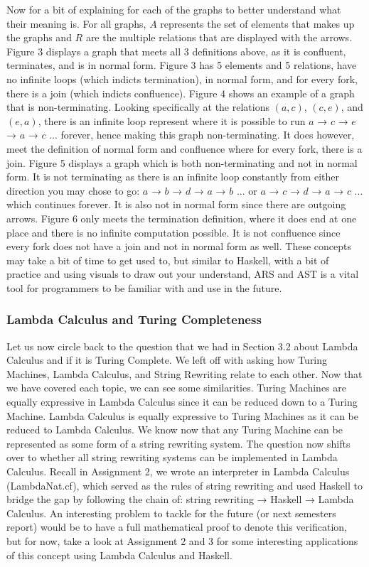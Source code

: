\documentclass{article}
\begin{document}
Now for a bit of explaining for each of the graphs to better understand what their meaning is. For all graphs, $A$ represents the set of elements that makes up the graphs and $R$ are the multiple relations that are displayed with the arrows. Figure 3 displays a graph that meets all 3 definitions above, as it is confluent, terminates, and is in normal form. Figure 3 has 5 elements and 5 relations, have no infinite loops (which indicts termination), in normal form, and for every fork, there is a join (which indicts confluence). Figure 4 shows an example of a graph that is non-terminating. Looking specifically at the relations $(a,c)$, $(c,e)$, and $(e,a)$, there is an infinite loop represent where it is possible to run $a$ → $c$ → $e$ → $a$ → $c$ ... forever, hence making this graph non-terminating. It does however, meet the definition of normal form and confluence where for every fork, there is a join. Figure 5 displays a graph which is both non-terminating and not in normal form. It is not terminating as there is an infinite loop constantly from either direction you may chose to go:  $a$ → $b$ → $d$ → $a$ → $b$ ... or  $a$ → $c$ → $d$ → $a$ → $c$ ... which continues forever. It is also not in normal form since there are outgoing arrows. Figure 6 only meets the termination definition, where it does end at one place and there is no infinite computation possible. It is not confluence since every fork does not have a join and not in normal form as well. These concepts may take a bit of time to get used to, but similar to Haskell, with a bit of practice and using visuals to draw out your understand, ARS and AST is a vital tool for programmers to be familiar with and use in the future.

\subsubsection{Lambda Calculus and Turing Completeness}
Let us now circle back to the question that we had in Section 3.2 about Lambda Calculus and if it is Turing Complete. We left off with asking how Turing Machines, Lambda Calculus, and String Rewriting relate to each other. Now that we have covered each topic, we can see some similarities. Turing Machines are equally expressive in Lambda Calculus since it can be reduced down to a Turing Machine. Lambda Calculus is equally expressive to Turing Machines as it can be reduced to Lambda Calculus. We know now that any Turing Machine can be represented as some form of a string rewriting system. The question now shifts over to whether all string rewriting systems can be implemented in Lambda Calculus. Recall in Assignment 2, we wrote an interpreter in Lambda Calculus (LambdaNat.cf), which served as the rules of string rewriting and used Haskell to bridge the gap by following the chain of: string rewriting → Haskell → Lambda Calculus. An interesting problem to tackle for the future (or next semesters report) would be to have a full mathematical proof to denote this verification, but for now, take a look at Assignment 2 and 3 for some interesting applications of this concept using Lambda Calculus and Haskell.
\end{document}
